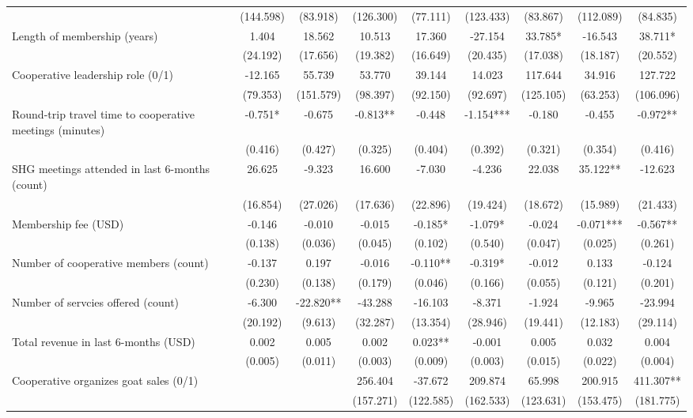 \documentclass[11pt]{article}
\begin{document}
\begin{landscape}
\begin{table}[H]
{\begin{tabularx}{1.8\linewidth}{lcccccccc}
 & (144.598) & (83.918) & (126.300) & (77.111) & (123.433) & (83.867) & (112.089) & (84.835) \\
Length of membership (years) & 1.404 & 18.562 & 10.513 & 17.360 & -27.154 & 33.785* & -16.543 & 38.711* \\
 & (24.192) & (17.656) & (19.382) & (16.649) & (20.435) & (17.038) & (18.187) & (20.552) \\
Cooperative leadership role (0/1) & -12.165 & 55.739 & 53.770 & 39.144 & 14.023 & 117.644 & 34.916 & 127.722 \\
 & (79.353) & (151.579) & (98.397) & (92.150) & (92.697) & (125.105) & (63.253) & (106.096) \\
Round-trip travel time to cooperative meetings (minutes) & -0.751* & -0.675 & -0.813** & -0.448 & -1.154*** & -0.180 & -0.455 & -0.972** \\
 & (0.416) & (0.427) & (0.325) & (0.404) & (0.392) & (0.321) & (0.354) & (0.416) \\
SHG meetings attended in last 6-months (count) & 26.625 & -9.323 & 16.600 & -7.030 & -4.236 & 22.038 & 35.122** & -12.623 \\
 & (16.854) & (27.026) & (17.636) & (22.896) & (19.424) & (18.672) & (15.989) & (21.433) \\
Membership fee (USD) & -0.146 & -0.010 & -0.015 & -0.185* & -1.079* & -0.024 & -0.071*** & -0.567** \\
 & (0.138) & (0.036) & (0.045) & (0.102) & (0.540) & (0.047) & (0.025) & (0.261) \\
Number of cooperative members (count) & -0.137 & 0.197 & -0.016 & -0.110** & -0.319* & -0.012 & 0.133 & -0.124 \\
 & (0.230) & (0.138) & (0.179) & (0.046) & (0.166) & (0.055) & (0.121) & (0.201) \\
Number of servcies offered (count) & -6.300 & -22.820** & -43.288 & -16.103 & -8.371 & -1.924 & -9.965 & -23.994 \\
 & (20.192) & (9.613) & (32.287) & (13.354) & (28.946) & (19.441) & (12.183) & (29.114) \\
Total revenue in last 6-months (USD) & 0.002 & 0.005 & 0.002 & 0.023** & -0.001 & 0.005 & 0.032 & 0.004 \\
 & (0.005) & (0.011) & (0.003) & (0.009) & (0.003) & (0.015) & (0.022) & (0.004) \\
 Cooperative organizes goat sales (0/1) &  &  & 256.404 & -37.672 & 209.874 & 65.998 & 200.915 & 411.307** \\
 &  &  & (157.271) & (122.585) & (162.533) & (123.631) & (153.475) & (181.775) \\

\end{tabularx}}
\end{table}
\end{landscape}
\end{document}
